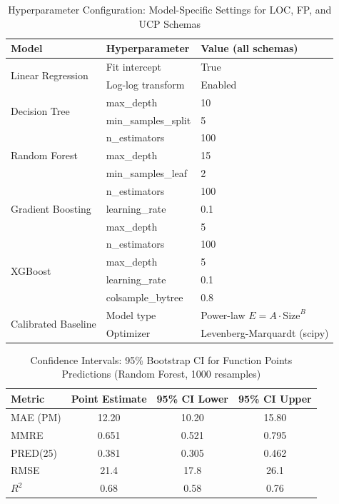 \documentclass[11pt,a4paper]{article}
\begin{document}
\begin{table}[h]
\centering
\caption{Hyperparameter Configuration: Model-Specific Settings for LOC, FP, and UCP Schemas}
\label{tab:hyperparams}
\begin{tabular}{|l|l|l|}
\hline
\textbf{Model} & \textbf{Hyperparameter} & \textbf{Value (all schemas)} \\
\hline
\multirow{2}{*}{Linear Regression} & Fit intercept & True \\
 & Log-log transform & Enabled \\
\hline
\multirow{2}{*}{Decision Tree} & max\_depth & 10 \\
 & min\_samples\_split & 5 \\
\hline
\multirow{3}{*}{Random Forest} & n\_estimators & 100 \\
 & max\_depth & 15 \\
 & min\_samples\_leaf & 2 \\
\hline
\multirow{3}{*}{Gradient Boosting} & n\_estimators & 100 \\
 & learning\_rate & 0.1 \\
 & max\_depth & 5 \\
\hline
\multirow{4}{*}{XGBoost} & n\_estimators & 100 \\
 & max\_depth & 5 \\
 & learning\_rate & 0.1 \\
 & colsample\_bytree & 0.8 \\
\hline
\multirow{2}{*}{Calibrated Baseline} & Model type & Power-law $E = A \cdot \text{Size}^B$ \\
 & Optimizer & Levenberg-Marquardt (scipy) \\
\hline
\end{tabular}
\end{table}

\begin{table}[h]
\centering
\caption{Confidence Intervals: 95\% Bootstrap CI for Function Points Predictions (Random Forest, 1000 resamples)}
\label{tab:bootstrap-ci}
\begin{tabular}{|l|c|c|c|}
\hline
\textbf{Metric} & \textbf{Point Estimate} & \textbf{95\% CI Lower} & \textbf{95\% CI Upper} \\
\hline
MAE (PM) & 12.20 & 10.20 & 15.80 \\
MMRE & 0.651 & 0.521 & 0.795 \\
PRED(25) & 0.381 & 0.305 & 0.462 \\
RMSE & 21.4 & 17.8 & 26.1 \\
$R^2$ & 0.68 & 0.58 & 0.76 \\
\hline
\end{tabular}
\end{table}
\end{document}
